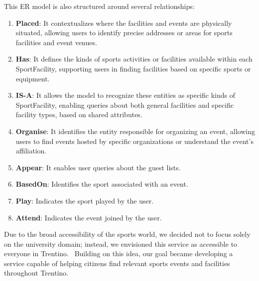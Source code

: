 \noindent This ER model is also structured around several relationships:
\begin{enumerate}
    \item \textbf{Placed}: It contextualizes where the facilities and events are physically situated, allowing users to identify precise addresses or areas for sports facilities and event venues.
    \item \textbf{Has}: It defines the kinds of sports activities or facilities available within each SportFacility, supporting users in finding facilities based on specific sports or equipment.
    \item \textbf{IS-A}: It allows the model to recognize these entities as specific kinds of SportFacility, enabling queries about both general facilities and specific facility types, based on shared attributes.
    \item \textbf{Organise}: It identifies the entity responsible for organizing an event, allowing users to find events hosted by specific organizations or understand the event’s affiliation.
    \item \textbf{Appear}: It enables user queries about the guest lists.
    \item \textbf{BasedOn}: Identifies the sport associated with an event.
    \item \textbf{Play}: Indicates the sport played by the user.
    \item \textbf{Attend}: Indicates the event joined by the user.
\end{enumerate}

\noindent Due to the broad accessibility of the sports world, we decided not to focus solely on the university domain; instead, we envisioned this service as accessible to everyone in Trentino. \ Building on this idea, our goal became developing a service capable of helping citizens find relevant sports events and facilities throughout Trentino.

